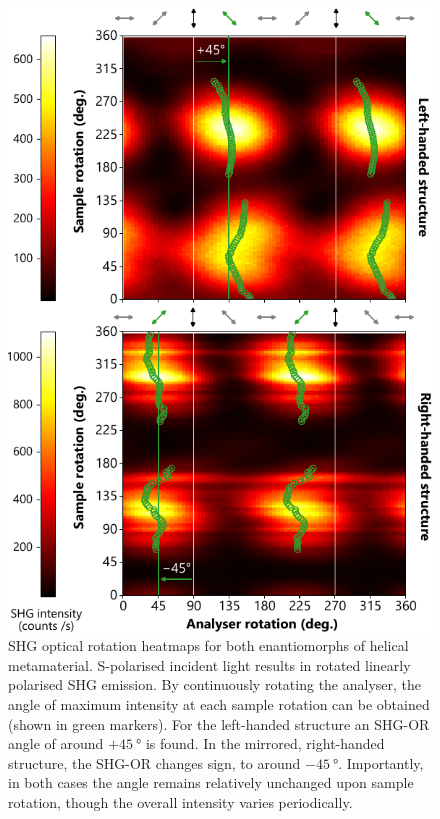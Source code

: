 \begin{figure}[htb!]	
    \centering	
    \includegraphics[scale=1]{./figures/results/OAinPlanarNanohelices/s_data.pdf}

    \caption{\label{fig:results:OAinPlanarNanohelices:s_data}
    SHG optical rotation heatmaps for both enantiomorphs of helical metamaterial. S-polarised incident light results in rotated linearly polarised SHG emission. By continuously rotating the analyser, the angle of maximum intensity at each sample rotation can be obtained (shown in green markers). For the left-handed structure an SHG-OR angle of around $+\SI{45}{\degree}$ is found. In the mirrored, right-handed structure, the SHG-OR changes sign, to around $-\SI{45}{\degree}$. Importantly, in both cases the angle remains relatively unchanged upon sample rotation, though the overall intensity varies periodically.}	
\end{figure}

